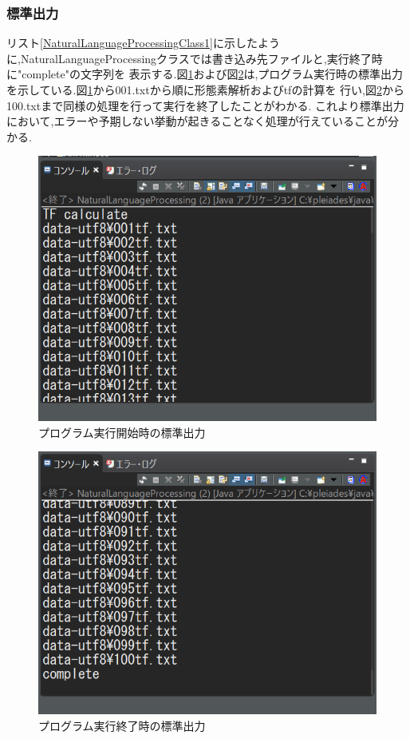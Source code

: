 \documentclass[a4j]{jarticle}
\begin{document}
\subsubsection{標準出力}
リスト\ref{NaturalLanguageProcessingClass1}に示したように,NaturalLanguageProcessingクラスでは書き込み先ファイルと,実行終了時に"complete"の文字列を
表示する.図\ref{starttf}および図\ref{endtf}は,プログラム実行時の標準出力を示している.図\ref{starttf}から001.txtから順に形態素解析およびtfの計算を
行い,図\ref{endtf}から100.txtまで同様の処理を行って実行を終了したことがわかる.
これより標準出力において,エラーや予期しない挙動が起きることなく処理が行えていることが分かる.
\begin{figure}[H]
	\centering
	\includegraphics[scale=0.65]{starttf.png}
	\caption{プログラム実行開始時の標準出力}
   \label{starttf}
  \end{figure}

  \begin{figure}[H]
	\centering
	\includegraphics[scale=0.65]{endtf.png}
	\caption{プログラム実行終了時の標準出力}
   \label{endtf}
  \end{figure}
\end{document}
